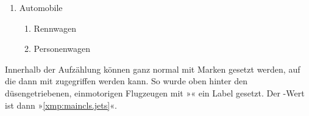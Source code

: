 \begin{Example}
\begin{ShowOutput}[\baselineskip]
\begin{enumerate}
        \item Automobile
          \begin{enumerate}
          \item Rennwagen
          \item Personenwagen
          \end{enumerate}
        \end{enumerate}
      \end{ShowOutput}
      Innerhalb der Aufzählung können ganz normal mit  Marken
      gesetzt werden, auf die dann mit  zugegriffen werden
      kann. So wurde oben hinter den düsengetriebenen, einmotorigen
      Flugzeugen mit »« ein Label
      gesetzt. Der -Wert ist dann »\ref*{xmp:maincls.jets}«.
    \end{Example}%
    \ExampleEndFix
  \fi
  \EndIndexGroup


